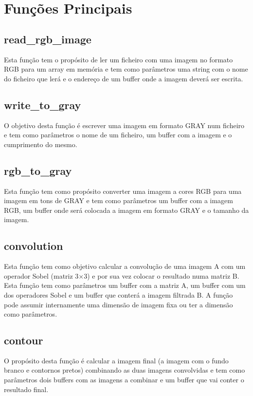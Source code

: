 \documentclass{report}
\begin{document}
\chapter{Funções Principais}

\section{read\_rgb\_image}
Esta função tem o propósito de ler um ficheiro com uma imagem no formato RGB para um array em
memória e tem como parâmetros uma string com o nome do ficheiro que lerá e
o endereço de um buffer onde a imagem deverá ser escrita.

\section{write\_to\_gray}
O objetivo desta função é escrever uma imagem em formato GRAY num ficheiro e 
tem como parâmetros o nome de um ficheiro, um buffer com a imagem e o cumprimento do mesmo.

\section{rgb\_to\_gray}
Esta função tem como propósito converter uma imagem a cores RGB para uma imagem em tons de GRAY e tem como parâmetros um buffer com a imagem RGB, um buffer onde será colocada a imagem em formato GRAY e o tamanho da imagem.

\section{convolution}
Esta função tem como objetivo calcular a convolução de uma imagem A com um operador Sobel (matriz
3×3) e por sua vez colocar o resultado numa matriz B. Esta função tem como parâmetros um buffer
com a matriz A, um buffer com um dos operadores Sobel e um buffer que conterá
a imagem filtrada B. A função pode assumir internamente uma dimensão de imagem
fixa ou ter a dimensão como parâmetros.

\section{contour}
O propósito desta função é calcular a imagem final (a imagem com o fundo branco e contornos pretos) combinando as duas imagens convolvidas e tem como parâmetros dois buffers com as imagens a combinar e um buffer que vai conter o resultado final.
\end{document}
